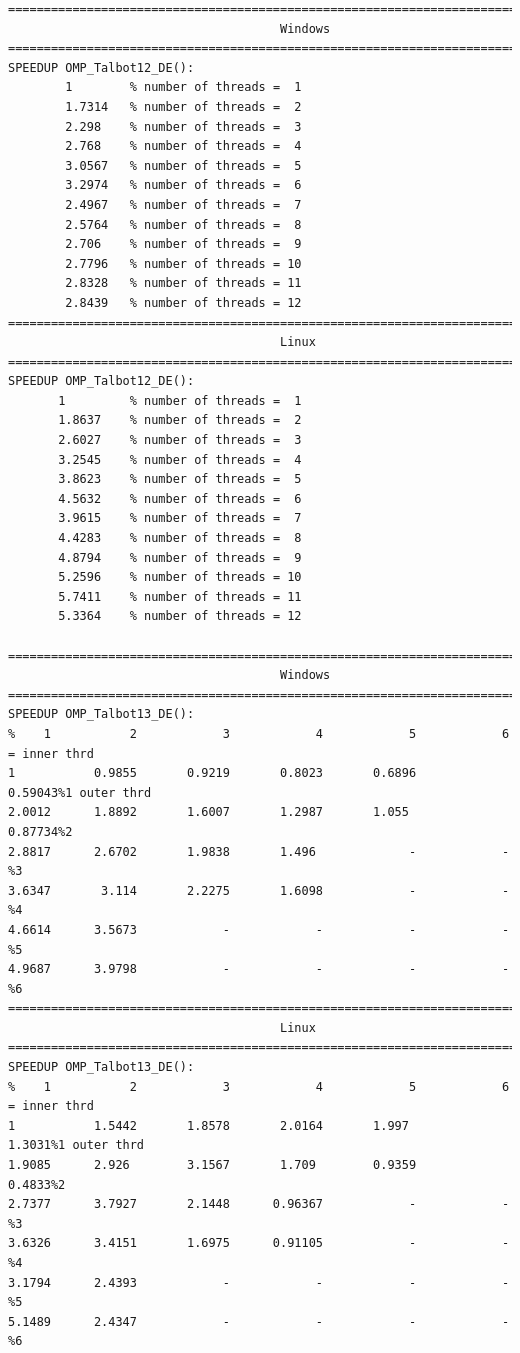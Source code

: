 \documentclass[a4paper,10pt]{report}%
\begin{document}
\begin{lstlisting}
====================================================================================
                                      Windows
====================================================================================
SPEEDUP OMP_Talbot12_DE():
        1        % number of threads =  1
        1.7314   % number of threads =  2
        2.298    % number of threads =  3
        2.768    % number of threads =  4
        3.0567   % number of threads =  5
        3.2974   % number of threads =  6
        2.4967   % number of threads =  7
        2.5764   % number of threads =  8
        2.706    % number of threads =  9
        2.7796   % number of threads = 10
        2.8328   % number of threads = 11
        2.8439   % number of threads = 12
====================================================================================
                                      Linux
====================================================================================
SPEEDUP OMP_Talbot12_DE():
       1         % number of threads =  1
       1.8637    % number of threads =  2
       2.6027    % number of threads =  3
       3.2545    % number of threads =  4
       3.8623    % number of threads =  5
       4.5632    % number of threads =  6
       3.9615    % number of threads =  7
       4.4283    % number of threads =  8
       4.8794    % number of threads =  9
       5.2596    % number of threads = 10
       5.7411    % number of threads = 11
       5.3364    % number of threads = 12

====================================================================================
                                      Windows
====================================================================================
SPEEDUP OMP_Talbot13_DE():
%    1           2            3            4            5            6 = inner thrd
1           0.9855       0.9219       0.8023       0.6896      0.59043%1 outer thrd
2.0012      1.8892       1.6007       1.2987       1.055       0.87734%2
2.8817      2.6702       1.9838       1.496             -            -%3
3.6347       3.114       2.2275       1.6098            -            -%4
4.6614      3.5673            -            -            -            -%5
4.9687      3.9798            -            -            -            -%6
====================================================================================
                                      Linux
====================================================================================
SPEEDUP OMP_Talbot13_DE():
%    1           2            3            4            5            6 = inner thrd
1           1.5442       1.8578       2.0164       1.997        1.3031%1 outer thrd
1.9085      2.926        3.1567       1.709        0.9359       0.4833%2
2.7377      3.7927       2.1448      0.96367            -            -%3
3.6326      3.4151       1.6975      0.91105            -            -%4
3.1794      2.4393            -            -            -            -%5
5.1489      2.4347            -            -            -            -%6
\end{lstlisting}
\end{document}
